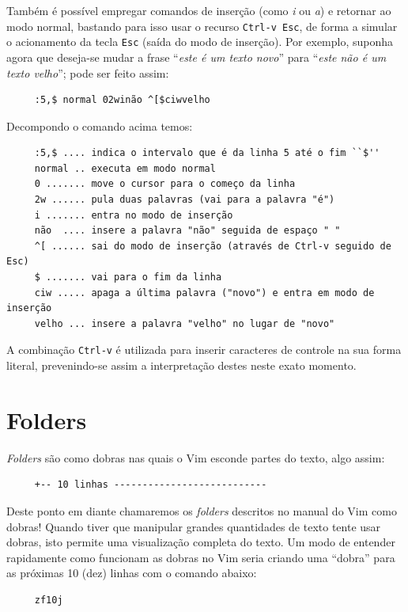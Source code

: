 \documentclass[10pt,a4paper,openany]{book}
\begin{document}
Também é possível empregar comandos de inserção (como {\em i} ou {\em a}) e
retornar ao modo normal, bastando para isso usar o recurso \verb|Ctrl-v Esc|,
de forma a simular o acionamento da tecla \verb|Esc| (saída do modo de
inserção). Por exemplo, suponha agora que deseja-se mudar a frase ``{\em este
é um texto novo}'' para ``{\em este não é um texto velho}''; pode ser feito
assim:

\begin{verbatim}
     :5,$ normal 02winão ^[$ciwvelho
\end{verbatim}

Decompondo o comando acima temos:

\begin{verbatim}
     :5,$ .... indica o intervalo que é da linha 5 até o fim ``$''
     normal .. executa em modo normal
     0 ....... move o cursor para o começo da linha
     2w ...... pula duas palavras (vai para a palavra "é")
     i ....... entra no modo de inserção
     não  .... insere a palavra "não" seguida de espaço " "
     ^[ ...... sai do modo de inserção (através de Ctrl-v seguido de Esc)
     $ ....... vai para o fim da linha
     ciw ..... apaga a última palavra ("novo") e entra em modo de inserção
     velho ... insere a palavra "velho" no lugar de "novo"
\end{verbatim}

A combinação \verb|Ctrl-v| é utilizada para inserir caracteres de controle na
sua forma literal, prevenindo-se assim a interpretação destes neste exato
momento.
\chapter{Folders}\label{cha:Folders}
{\em Folders} são como dobras nas quais o Vim esconde partes do texto,
algo assim:

\begin{verbatim}
     +-- 10 linhas ---------------------------
\end{verbatim}

Deste ponto em diante chamaremos os {\em folders} descritos no manual do
Vim como dobras!  Quando tiver que manipular grandes quantidades de
texto tente usar dobras, isto permite uma visualização completa do
texto.  Um modo de entender rapidamente como funcionam as dobras no
Vim seria criando uma ``dobra'' para as próximas 10 (dez) linhas com o
comando abaixo:

\begin{verbatim}
     zf10j
\end{verbatim}
\end{document}
